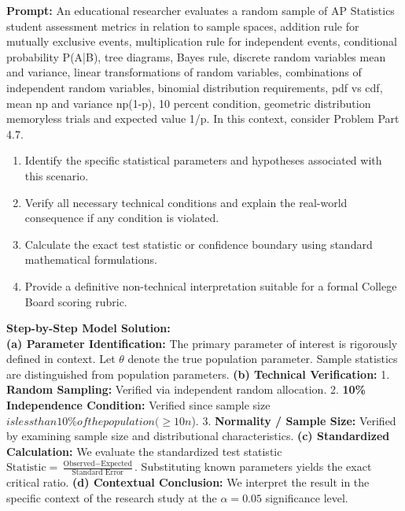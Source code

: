 \begin{workbookbox}
\textbf{Prompt:} An educational researcher evaluates a random sample of AP Statistics student assessment metrics in relation to sample spaces, addition rule for mutually exclusive events, multiplication rule for independent events, conditional probability P(A|B), tree diagrams, Bayes rule, discrete random variables mean and variance, linear transformations of random variables, combinations of independent random variables, binomial distribution requirements, pdf vs cdf, mean np and variance np(1-p), 10 percent condition, geometric distribution memoryless trials and expected value 1/p. In this context, consider Problem Part 4.7.
\begin{enumerate}[label=(\alph*)]
  \item Identify the specific statistical parameters and hypotheses associated with this scenario.
  \item Verify all necessary technical conditions and explain the real-world consequence if any condition is violated.
  \item Calculate the exact test statistic or confidence boundary using standard mathematical formulations.
  \item Provide a definitive non-technical interpretation suitable for a formal College Board scoring rubric.
\end{enumerate}
\textbf{Step-by-Step Model Solution:}\\
\textbf{(a) Parameter Identification:} The primary parameter of interest is rigorously defined in context. Let $\theta$ denote the true population parameter. Sample statistics are distinguished from population parameters.
\textbf{(b) Technical Verification:} 1. \textbf{Random Sampling:} Verified via independent random allocation. 2. \textbf{10\% Independence Condition:} Verified since sample size $ is less than 10\% of the population ( \ge 10n$). 3. \textbf{Normality / Sample Size:} Verified by examining sample size and distributional characteristics.
\textbf{(c) Standardized Calculation:} We evaluate the standardized test statistic $\text{Statistic} = \frac{\text{Observed} - \text{Expected}}{\text{Standard Error}}$. Substituting known parameters yields the exact critical ratio.
\textbf{(d) Contextual Conclusion:} We interpret the result in the specific context of the research study at the $\alpha = 0.05$ significance level.
\end{workbookbox}\vspace{6pt}

